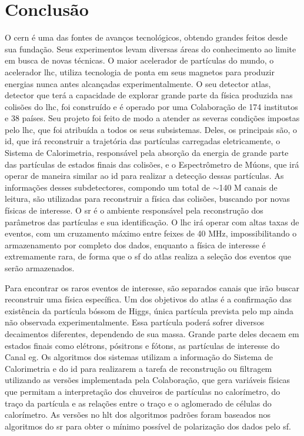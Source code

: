 \chapter{Conclusão}

O \gls{cern} é uma das fontes de avanços tecnológicos, obtendo grandes feitos
desde sua fundação. Seus experimentos
levam diversas áreas do conhecimento ao limite em busca de novas técnicas. 
O maior acelerador de partículas do mundo, o acelerador \gls{lhc}, utiliza
tecnologia de ponta em seus magnetos para produzir energias nunca antes
alcançadas experimentalmente. O seu detector \gls{atlas}, detector que terá a
capacidade de explorar grande parte da física produzida nas colisões do
\gls{lhc}, foi construído e é operado por uma Colaboração de 174 institutos e 38 
países. Seu projeto foi feito de modo a atender as severas condições impostas
pelo \gls{lhc}, que foi atribuída a todos os seus subsistemas. Deles, os principais são, 
o \gls{id}, que irá reconstruir a trajetória das partículas carregadas 
eletricamente, o Sistema de Calorimetria, responsável pela absorção da energia 
de grande parte das partículas de estados finais das colisões, e o Espectrômetro de 
Múons, que irá operar de maneira similar ao \gls{id} para realizar a detecção 
dessas partículas. As informações desses subdetectores, compondo um total de
$\sim$140 M canais de leitura, são utilizadas para reconstruir a física das colisões, 
buscando por novas físicas de interesse. O
\glsdesc{sr} é o ambiente responsável pela reconstrução dos parâmetros das
partículas e sua identificação. O \gls{lhc} irá operar com altas
taxas de eventos, com um cruzamento máximo entre feixes de 40 MHz,
impossibilitando o armazenamento por completo dos dados, enquanto
a física de interesse é extremamente rara, de forma que o \glsdesc{sf} do
\gls{atlas} realiza a seleção dos eventos que serão armazenados.

Para encontrar os raros eventos de interesse, são separados canais que irão
buscar reconstruir uma física específica. Um dos objetivos do \gls{atlas} é a
confirmação das existência da partícula bóssom de Higgs, única partícula
prevista pelo \gls{mp} ainda não observada experimentalmente. Essa partícula
poderá sofrer diversos decaimentos diferentes, dependendo de sua massa. Grande
parte deles decaem em estados finais como elétrons, pósitrons e fótons, as
partículas de interesse do Canal \gls{eg}. Os algoritmos dos sistemas
utilizam a informação do Sistema de Calorimetria e do \gls{id} para realizarem a
tarefa de reconstrução ou filtragem utilizando as versões implementada pela
Colaboração, que gera variáveis físicas que permitam a interpretação dos
chuveiros de partículas no calorímetro, do traço da partícula e as relações
entre o traço e o aglomerado de células do calorímetro. As versões no \gls{hlt}
dos algoritmos padrões foram baseados nos algoritmos do \gls{sr} para obter o
mínimo possível de polarização dos dados pelo \gls{sf}.

